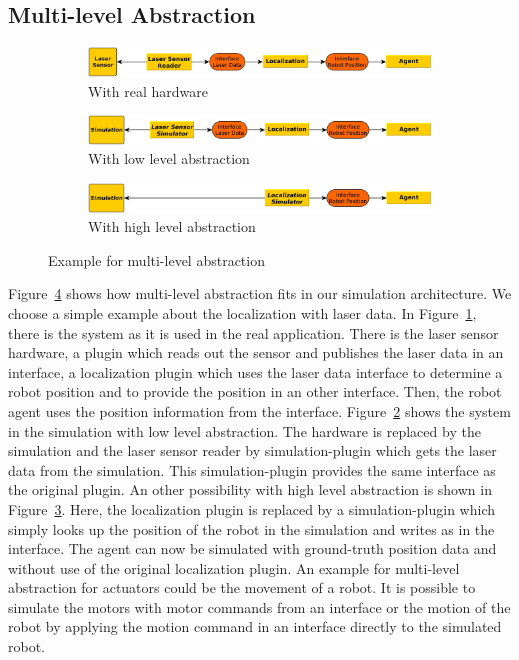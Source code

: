 \subsection{Multi-level Abstraction}
\begin{figure}
\centering
\begin{subfigure}[b]{\textwidth}
\includegraphics[width=\textwidth]{tabs/mla_hardware}
\caption{With real hardware}
\label{fig:mla_hardware}
\end{subfigure}
\begin{subfigure}[b]{\textwidth}
\includegraphics[width=\textwidth]{tabs/mla_sim_low}
\caption{With low level abstraction}
\label{fig:mla_sim_low}
\end{subfigure}
\begin{subfigure}[b]{\textwidth}
\includegraphics[width=\textwidth]{tabs/mla_sim_high}
\caption{With high level abstraction}
\label{fig:mla_sim_high}
\end{subfigure}
\caption{Example for multi-level abstraction}
\label{fig:mla}
\end{figure}
Figure~\ref{fig:mla} shows how multi-level abstraction fits in our simulation architecture. We choose a simple example about the localization with laser data. In Figure~\ref{fig:mla_hardware}, there is the system as it is used in the real application. There is the laser sensor hardware, a plugin which reads out the sensor and publishes the laser data in an interface, a localization plugin which uses the laser data interface to determine a robot position and to provide the position in an other interface. Then, the robot agent uses the position information from the interface. Figure~\ref{fig:mla_sim_low} shows the system in the simulation with low level abstraction. The hardware is replaced by the simulation and the laser sensor reader by simulation-plugin which gets the laser data from the simulation. This simulation-plugin provides the same interface as the original plugin. An other possibility with high level abstraction is shown in Figure~\ref{fig:mla_sim_high}. Here, the localization plugin is replaced by a simulation-plugin which simply looks up the position of the robot in the simulation and writes as in the interface. The agent can now be simulated with ground-truth position data and without use of the original localization plugin. An example for multi-level abstraction for actuators could be the movement of a robot. It is possible to simulate the motors with motor commands from an interface or the motion of the robot by applying the motion command in an interface directly to the simulated robot.
